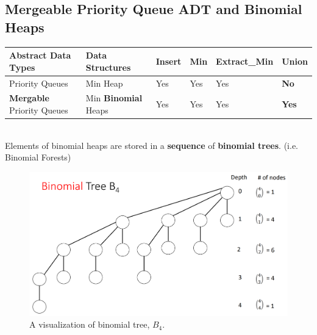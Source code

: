 \documentclass{article}
\begin{document}
\subsection{Mergeable Priority Queue ADT and Binomial Heaps}
\begin{table}[h]
\begin{tabular}{|l|l|l|l|l|l|}
\hline
Abstract Data Types      & Data Structures   & Insert & Min & Extract\_Min & Union \\ \hline
Priority Queues          & Min Heap          &    Yes    &  Yes   & Yes             &   \textbf{No}    \\ \hline
\textbf{Mergable} Priority Queues & Min \textbf{Binomial} Heaps &   Yes     &   Yes  & Yes             &   \textbf{Yes}    \\ \hline
\end{tabular}
\end{table}
\\
Elements of binomial heaps are stored in a \textbf{sequence} of \textbf{binomial trees}. (i.e. Binomial Forests)
\begin{figure}[h]
\begin{center}\includegraphics[scale=0.7]{image008.png}\end{center}
\caption{A visualization of binomial tree,  $B_4$.}
\end{figure}
\end{document}
